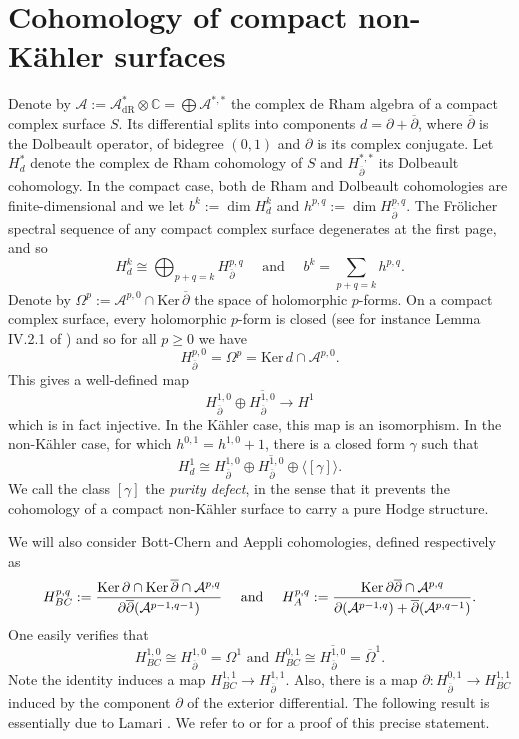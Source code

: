 \documentclass[a4paper]{amsart}
\theoremstyle{definition}
\newcommand{\CC}{\mathbb{C}}
\newcommand{\Aa}{\mathcal{A}}
\newcommand{\Ker}{\mathrm{Ker}\,}
\newcommand{\ov}{\overline}
\newcommand{\del}{\partial}
\newcommand{\delb}{{\overline\partial}}
\newcommand{\lra}{\longrightarrow}
\newcommand{\dR}{\mathrm{dR}}
\begin{document}
\section{Cohomology of compact non-Kähler surfaces}\label{seccohom}



Denote by $\Aa:=\Aa_{\dR}^*\otimes\CC=\bigoplus \Aa^{*,*}$ the complex de Rham algebra of a compact complex surface $S$. Its differential splits into components $d=\del+\delb$, where $\delb$ is the Dolbeault operator, of bidegree $(0,1)$ and $\del$ is its complex conjugate. Let
$H^*_d$ denote the complex de Rham cohomology of $S$ and
$H^{*,*}_\delb$ its Dolbeault cohomology.
In the compact case, both de Rham and Dolbeault cohomologies are finite-dimensional and we let $b^k:=\dim H_d^k$ and $h^{p,q}:=\dim H_\delb^{p,q}$.
The Frölicher spectral sequence of any compact complex surface degenerates at the first page, and so
\[H^k_d\cong\bigoplus_{p+q=k}H^{p,q}_\delb  \quad\text{ and }\quad b^k=\sum_{p+q=k} h^{p,q}.\]
Denote by $\Omega^{p}:=\Aa^{p,0}\cap\Ker\delb$ the space of holomorphic $p$-forms.
On a compact complex surface, every holomorphic $p$-form is closed (see for instance Lemma IV.2.1 of \cite{Barth}) and so for all $p\geq 0$ we have
\[H^{p,0}_\delb=\Omega^p=\Ker d\cap \Aa^{p,0}.\]
This gives a well-defined map 
\[H^{1,0}_\delb\oplus \overline{H^{1,0}_\delb}\lra H^1\]
which is in fact injective. In the Kähler case, this map is an isomorphism. In the non-Kähler case,
for which $h^{0,1}=h^{1,0}+1$,
there is a closed form $\gamma$ such that
\[H^1_d\cong H^{1,0}_\delb\oplus \ov{H^{1,0}_\delb}\oplus\langle[\gamma]\rangle.\]
We call the class $[\gamma]$ the \textit{purity defect}, in the sense that it prevents the cohomology of a compact non-Kähler surface to carry a pure Hodge structure.

We will also consider
Bott-Chern and Aeppli cohomologies, defined respectively as
\[H^{p,q}_{BC}:={{\Ker\del\cap\Ker\delb\cap\Aa^{p,q}}\over{\del\delb(\Aa^{p-1,q-1})}}
\quad\text{ and }\quad H^{p,q}_{A}:={{\Ker\del\delb\cap\Aa^{p,q}}\over{\del(\Aa^{p-1,q})+\delb(\Aa^{p,q-1})}}.
\]
One easily verifies that 
\[H^{1,0}_{BC}\cong H^{1,0}_\delb=\Omega^1\text{ and }H^{0,1}_{BC}\cong \overline{{H}^{1,0}_\delb}=\ov\Omega^1.\]
Note the identity induces a map $H^{1,1}_{BC}\to H^{1,1}_\delb$. Also, there is a map
$\del:H^{0,1}_\delb\lra H^{1,1}_{BC}$
induced by the component $\del$ of the exterior differential.
The following result is essentially due to Lamari \cite{La}. We refer to \cite{Verbook} or \cite{Verb}
for a proof of this precise statement.
\end{document}
